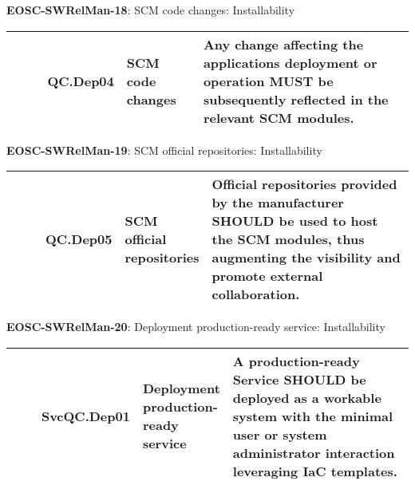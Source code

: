 \textbf{EOSC-SWRelMan-18}: SCM code changes: Installability
\nopagebreak[4]
\begin{center}
    \tabletail{\hline}
    \tiny
    \begin{supertabular}{|p{0.10\linewidth}|p{0.10\linewidth}|p{0.20\linewidth}|p{0.60\linewidth}|} \hline
        \cite{orviz_set_2017} & QC.Dep04 & SCM code changes & Any change affecting the applications deployment or operation MUST be subsequently reflected in the relevant SCM modules.\\ \hline
    \end{supertabular}
\end{center}

\textbf{EOSC-SWRelMan-19}: SCM official repositories: Installability
\nopagebreak[4]
\begin{center}
    \tabletail{\hline}
    \tiny
    \begin{supertabular}{|p{0.10\linewidth}|p{0.10\linewidth}|p{0.20\linewidth}|p{0.60\linewidth}|} \hline
        \cite{orviz_set_2017} & QC.Dep05 & SCM official repositories & Official repositories provided by the manufacturer SHOULD be used to host the SCM modules, thus augmenting the visibility and promote external collaboration.\\ \hline
    \end{supertabular}
\end{center}

\textbf{EOSC-SWRelMan-20}: Deployment production-ready service: Installability
\nopagebreak[4]
\begin{center}
    \tabletail{\hline}
    \tiny
    \begin{supertabular}{|p{0.10\linewidth}|p{0.10\linewidth}|p{0.20\linewidth}|p{0.60\linewidth}|} \hline
        \cite{orviz_fernandez_eosc-synergy_2020} & SvcQC.Dep01 & Deployment production-ready service & A production-ready Service SHOULD be deployed as a workable system with the minimal user or system administrator interaction leveraging IaC templates.\\ \hline
    \end{supertabular}
\end{center}

